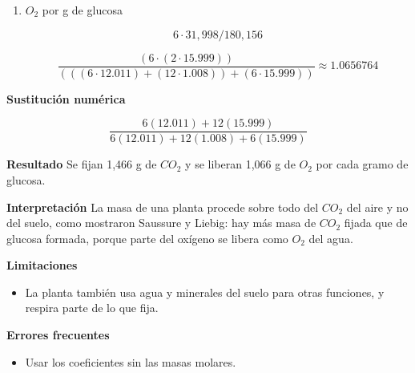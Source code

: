 \documentclass{book}
\begin{document}
\begin{tcolorbox}[title={Problema resuelto}, studiumworked, breakable]
\begin{enumerate}
\[
\frac{\left(6\cdot \left(12.011+\left(2\cdot 15.999\right)\right)\right)}{\left(\left(\left(6\cdot 12.011\right)+\left(12\cdot 1.008\right)\right)+\left(6\cdot 15.999\right)\right)} \approx 1.4656964
\]
\item
\(O_{2}\) por g de glucosa


\[
6\cdot31,998/180,156
\]

\[
\frac{\left(6\cdot \left(2\cdot 15.999\right)\right)}{\left(\left(\left(6\cdot 12.011\right)+\left(12\cdot 1.008\right)\right)+\left(6\cdot 15.999\right)\right)} \approx 1.0656764
\]
\end{enumerate}

\noindent\textbf{Sustitución numérica}

\[
\frac{6 \left(12.011\right) + 12 \left(15.999\right)}{6 \left(12.011\right) + 12 \left(1.008\right) + 6 \left(15.999\right)}
\]

\noindent\textbf{Resultado}
Se fijan 1,466 g de \(CO_{2}\) y se liberan 1,066 g de \(O_{2}\) por cada gramo de glucosa.


\noindent\textbf{Interpretación}
La masa de una planta procede sobre todo del \(CO_{2}\) del aire y no del suelo, como mostraron Saussure y Liebig: hay más masa de \(CO_{2}\) fijada que de glucosa formada, porque parte del oxígeno se libera como \(O_{2}\) del agua.


\noindent\textbf{Limitaciones}
\begin{itemize}
\item La planta también usa agua y minerales del suelo para otras funciones, y respira parte de lo que fija.
\end{itemize}

\noindent\textbf{Errores frecuentes}
\begin{itemize}
\item Usar los coeficientes sin las masas molares.
\end{itemize}
\end{tcolorbox}
\end{document}
